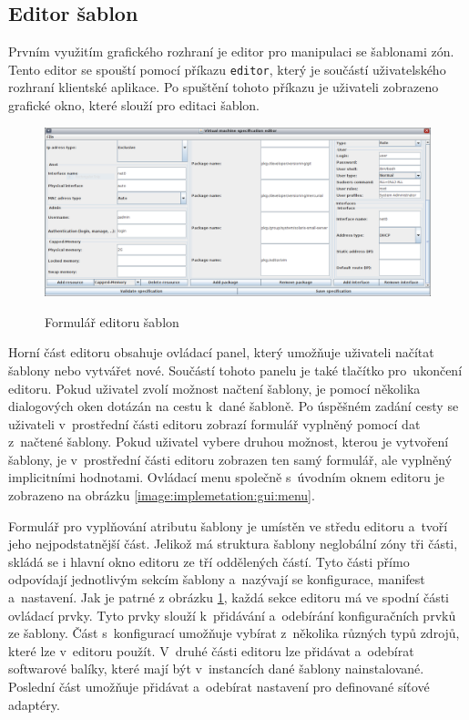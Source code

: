 \subsection{Editor šablon}
\label{chapter:implementation:gui:editor}
Prvním využitím grafického rozhraní je editor pro manipulaci se šablonami zón. Tento editor se spouští pomocí příkazu \verb|editor|,
který je součástí uživatelského rozhraní klientské aplikace. Po spuštění tohoto příkazu je uživateli zobrazeno grafické okno,
které slouží pro editaci šablon.
\begin{figure}[t]
    \centering    
    \caption{Formulář editoru šablon}
    \includegraphics[scale=0.35]{assets/png/implemetation_gui_form.png}
    \label{image:implemetation:gui:form}
\end{figure}
Horní část editoru obsahuje ovládací panel, který umožňuje uživateli načítat šablony nebo vytvářet nové. Součástí tohoto panelu
je také tlačítko pro~ukončení editoru. Pokud uživatel zvolí možnost načtení šablony, je pomocí několika dialogových oken dotázán
na cestu k~dané šabloně. Po úspěšném zadání cesty se uživateli v~prostřední části editoru zobrazí formulář vyplněný pomocí
dat z~načtené šablony. Pokud uživatel vybere druhou možnost, kterou je vytvoření šablony, je v~prostřední části editoru zobrazen 
ten samý formulář, ale vyplněný implicitními hodnotami. Ovládací menu společně s~úvodním oknem editoru je zobrazeno na 
obrázku \ref{image:implemetation:gui:menu}.

Formulář pro vyplňování atributu šablony je umístěn ve středu editoru a~tvoří jeho nejpodstatnější část. Jelikož má struktura 
šablony neglobální zóny tři části, skládá se i hlavní okno editoru ze tří oddělených částí. Tyto části přímo odpovídají jednotlivým
sekcím šablony a~nazývají se konfigurace, manifest a~nastavení. Jak je patrné z obrázku \ref{image:implemetation:gui:form}, každá
sekce editoru má ve spodní části ovládací prvky. Tyto prvky slouží k~přidávání a~odebírání konfiguračních prvků ze šablony. Část s~konfigurací
umožňuje vybírat z~několika různých typů zdrojů, které lze v~editoru použít. V~druhé části editoru lze přidávat a~odebírat
softwarové balíky, které mají být v~instancích dané šablony nainstalované. Poslední část umožňuje přidávat a~odebírat nastavení
pro definované síťové adaptéry.

